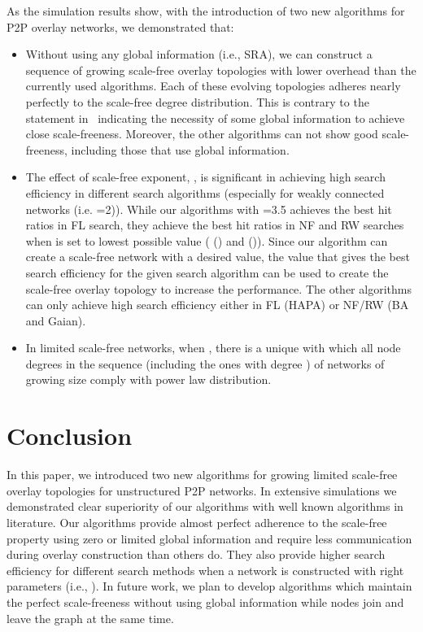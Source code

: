 \documentclass[10pt,journal,cspaper,compsoc]{IEEEtran}
\begin{document}
As the simulation results show, with the introduction of two new algorithms for P2P overlay networks, we demonstrated that:
\begin{itemize}
\item Without using any global information (i.e., SRA), we can construct a sequence of growing scale-free overlay topologies with lower overhead than the currently used algorithms. Each of these evolving topologies adheres nearly perfectly to the scale-free degree distribution. This is contrary to the statement in~\cite{guclu} indicating the necessity of some global information to achieve close scale-freeness. Moreover, the other algorithms can not show good scale-freeness, including those that use global information.
\item The effect of scale-free exponent, , is significant in achieving high search efficiency in different search algorithms (especially for weakly connected networks (i.e. =2)). While our algorithms with =3.5 achieves the best hit ratios in FL search, they achieve the best hit ratios in NF and RW searches when  is set to lowest possible value ( () and  ()). Since our algorithm can create a scale-free network with a desired  value, the value that gives the best search efficiency for the given search algorithm can be used to create the scale-free overlay topology to increase the performance. The other algorithms can only achieve high search efficiency either in FL (HAPA) or NF/RW (BA and Gaian).
\item In limited scale-free networks, when , there is a unique  with which all node degrees in the sequence (including the ones with degree ) of networks of growing size comply with power law distribution.
\end{itemize}









\section{Conclusion}
\label{sec:conclusion}

In this paper, we introduced two new algorithms for growing limited scale-free overlay topologies for unstructured P2P networks. In extensive simulations we demonstrated clear superiority of our algorithms with well known algorithms in literature. Our algorithms provide almost perfect adherence to the scale-free property using zero or limited global information and require less communication during overlay construction than others do. They also provide higher search efficiency for different search methods when a network is constructed with right parameters (i.e., ). In future work, we plan to develop algorithms which maintain the perfect scale-freeness without using global information while nodes join and leave the graph at the same time.
\end{document}

